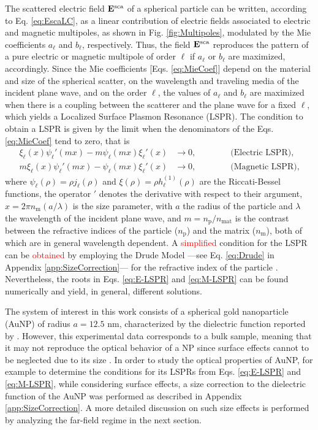 The scattered electric field $\vb{E}^\text{sca}$ of a spherical particle can be written, according to Eq. \eqref{eq:EscaLC}, as a linear contribution of electric fields associated to electric and magnetic multipoles, as shown in Fig. \ref{fig:Multipoles}, modulated by the Mie coefficients $a_\ell$ and $b_\ell$, respectively. Thus, the field $\vb{E}^\text{sca}$ reproduces the pattern of a pure  electric or magnetic multipole of order $\ell$ if $a_\ell$ or $b_\ell$ are maximized, accordingly. Since the Mie coefficients [Eqs. \eqref{eq:MieCoef}]  depend on the material and size of the spherical scatter, on the wavelength and traveling media of the incident plane wave, and on  the order $\ell$, the values of $a_\ell$ and $b_\ell$ are maximized when there is a coupling between the scatterer and the plane wave for a fixed $\ell$, which yields a Localized Surface Plasmon Resonance (LSPR). The condition to obtain a LSPR is given by the limit when the denominators of the Eqs. \eqref{eq:MieCoef} tend to zero, that is
%
\begin{align}
 	\xi_\ell(x)\psi_\ell'(mx)-m\psi_\ell(mx)\xi_\ell'(x) &\to 0, \qquad\qquad \text{(Electric LSPR),}
 		\label{eq:E-LSPR}\\
 	m\xi_\ell(x)\psi_\ell'(mx)-\psi_\ell(mx)\xi_\ell'(x) &\to 0, \qquad\qquad \text{(Magnetic LSPR),}
 		\label{eq:M-LSPR}
\end{align}
%
where $\psi_\ell( \rho) = \rho j_\ell(\rho)$ and $\xi(\rho) = \rho h_\ell^{(1)}(\rho)$  are the Riccati-Bessel functions, the operator $'$ denotes the derivative with respect to their argument,  $x= 2\pi n_\text{m} (a/\lambda)$ is the size parameter, with $a$ the radius of the particle and $\lambda$ the wavelength of the incident plane wave, and $m =  n_\text{p} / n_\text{mat}$ is the contrast between the refractive indices of the particle ($n_\text{p}$) and the matrix ($n_\text{m}$), both of which are in general wavelength dependent. A \textcolor{red}{simplified} condition for the  LSPR can be \textcolor{red}{obtained} by employing the Drude Model ---see Eq. \eqref{eq:Drude} in Appendix \ref{app:SizeCorrection}--- for the refractive index of the particle \cite{maciel_escudero_linear_2017}. Nevertheless, the roots in Eqs. \eqref{eq:E-LSPR} and \eqref{eq:M-LSPR} can be found numerically and yield, in general, different solutions.

The system of interest in this work consists of a spherical gold nanoparticle (AuNP) of  radius $a = 12.5$ nm, characterized by the dielectric function reported by \citeauthor{johnson_optical_1972} \cite{johnson_optical_1972}.  However, this experimental data corresponds to a bulk sample, meaning that it may not reproduce the optical behavior of a NP since surface effects cannot to be neglected  due to its size \cite{noguez_surface_2007}. In order to study  the optical properties of AuNP, for example to determine the conditions for its LSPRs from   Eqs. \eqref{eq:E-LSPR}  and \eqref{eq:M-LSPR}, while considering  surface effects,  a size correction to the dielectric function of the AuNP was performed as described in Appendix \ref{app:SizeCorrection}. A more detailed discussion on such size effects is performed by analyzing the far-field regime in the next section.

